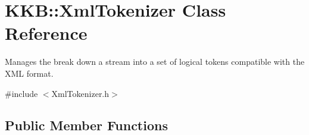 \hypertarget{class_k_k_b_1_1_xml_tokenizer}{}\section{K\+KB\+:\+:Xml\+Tokenizer Class Reference}
\label{class_k_k_b_1_1_xml_tokenizer}


Manages the break down a stream into a set of logical tokens compatible with the X\+ML format.  




{\ttfamily \#include $<$Xml\+Tokenizer.\+h$>$}

\subsection*{Public Member Functions}
